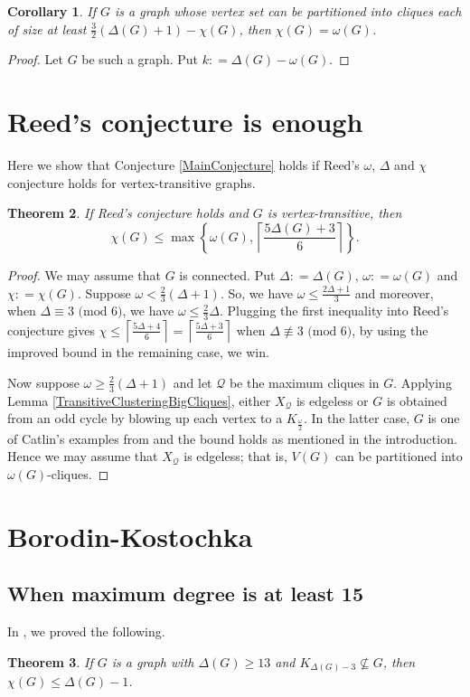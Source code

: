 \documentclass[12pt]{article}
\theoremstyle{plain}
\newtheorem{thm}{Theorem}[section]
\newtheorem{cor}[thm]{Corollary}
\theoremstyle{definition}
\theoremstyle{remark}
\newcommand{\fancy}[1]{\mathcal{#1}}
\newcommand{\set}[1]{\left\{ #1 \right\}}
\newcommand{\ceil}[1]{\left\lceil#1\right\rceil}
\newcommand{\parens}[1]{\left( #1 \right)}
\newcommand{\DefinedAs}{\mathrel{\mathop:}=}
\begin{document}
\begin{cor}
If $G$ is a graph whose vertex set can be partitioned into cliques each of size at least $\frac32 (\Delta(G) + 1) - \chi(G)$, then $\chi(G) = \omega(G)$.
\end{cor}
\begin{proof}
Let $G$ be such a graph.  Put $k \DefinedAs \Delta(G) - \omega(G)$.
\end{proof}

\section{Reed's conjecture is enough}
Here we show that Conjecture \ref{MainConjecture} holds if Reed's $\omega$, $\Delta$ and $\chi$ conjecture \cite{reed1998omega} holds for vertex-transitive graphs.  

\begin{thm}
If Reed's conjecture holds and $G$ is vertex-transitive, then 
$$\chi(G) \le \max \set{\omega(G), \ceil{\frac{5\Delta(G) + 3}{6}}}.$$
\end{thm}
\begin{proof}
We may assume that $G$ is connected. Put $\Delta \DefinedAs \Delta(G)$, $\omega \DefinedAs \omega(G)$ and $\chi \DefinedAs \chi(G)$. Suppose $\omega < \frac23 \parens{\Delta + 1}$.  So, we have $\omega \le \frac{2\Delta + 1}{3}$ and moreover, when $\Delta \equiv 3 \text{ (mod $6$)}$, we have $\omega \le \frac23 \Delta$.  Plugging the first inequality into Reed's conjecture gives $\chi \le \ceil{\frac{5\Delta + 4}{6}} = \ceil{\frac{5\Delta + 3}{6}}$ when $\Delta \not \equiv 3 \text{ (mod $6$)}$, by using the improved bound in the remaining case, we win.

Now suppose $\omega \ge \frac23 (\Delta + 1)$ and let $\fancy{Q}$ be the maximum cliques in $G$.  Applying Lemma \ref{TransitiveClusteringBigCliques}, either $X_\fancy{Q}$ is edgeless or $G$ is obtained from an odd cycle by blowing up each vertex to a $K_{\frac{\omega}{2}}$.  In the latter case, $G$ is one of Catlin's examples from \cite{catlin1979hajos} and the bound holds as mentioned in the introduction.  Hence we may assume that $X_\fancy{Q}$ is edgeless; that is, $V(G)$ can be partitioned into $\omega(G)$-cliques.
\end{proof}


\section{Borodin-Kostochka}
\subsection{When maximum degree is at least 15}
In \cite{bigcliques}, we proved the following.
\begin{thm}\label{BigCliquesExist}
If $G$ is a graph with $\Delta(G) \ge 13$ and $K_{\Delta(G) - 3} \not \subseteq G$, then $\chi(G) \le \Delta(G) - 1$.
\end{thm} 
\end{document}
